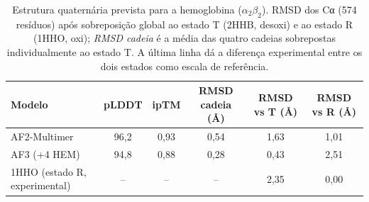 \begin{table}[H]\centering\small
\caption{Estrutura quaternária prevista para a hemoglobina ($\alpha_2\beta_2$). RMSD dos Cα (574 resíduos) após sobreposição global ao estado T (2HHB, desoxi) e ao estado R (1HHO, oxi); \emph{RMSD cadeia} é a média das quatro cadeias sobrepostas individualmente ao estado T. A última linha dá a diferença experimental entre os dois estados como escala de referência.}\label{tab:hemoglobina}
\begin{tabular}{lccccc}\toprule
Modelo & pLDDT & ipTM & RMSD cadeia (Å) & RMSD vs T (Å) & RMSD vs R (Å) \\\midrule
AF2-Multimer & 96,2 & 0,93 & 0,54 & 1,63 & 1,01 \\
AF3 (+4 HEM) & 94,8 & 0,88 & 0,28 & 0,43 & 2,51 \\
\midrule
1HHO (estado R, experimental) & -- & -- & -- & 2,35 & 0,00 \\
\bottomrule\end{tabular}\end{table}
